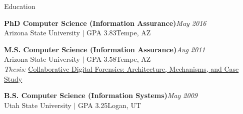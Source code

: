 \documentclass{resume} %
\begin{document}

\begin{rSection}{Education}

\textbf{PhD Computer Science (Information Assurance)}\hfill \emph{May 2016}\\
Arizona State University $\mid$ GPA 3.83\hfill {Tempe, AZ}

\textbf{M.S. Computer Science (Information Assurance)}\hfill \emph{Aug 2011}\\
Arizona State University $\mid$ GPA 3.58\hfill {Tempe, AZ}\\
\textit{Thesis:} \href{http://repository.asu.edu/attachments/56996/content/Mabey_asu_0010N_10959.pdf}{Collaborative Digital Forensics: Architecture, Mechanisms, and Case Study}

\textbf{B.S. Computer Science (Information Systems)}\hfill \emph{May 2009}\\
Utah State University $\mid$ GPA 3.25\hfill {Logan, UT}


\end{rSection}


\end{document}
